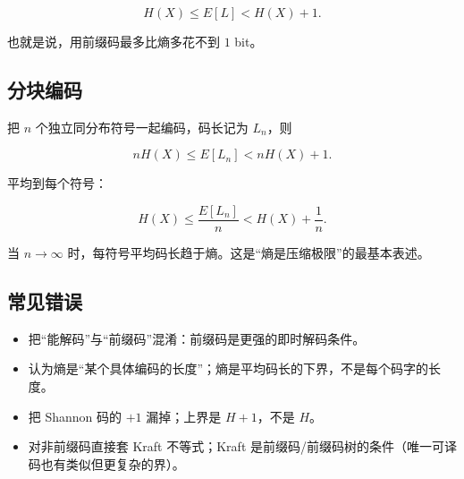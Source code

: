 \[
\boxed{
H(X)\le E[L]<H(X)+1
}.
\]

也就是说，用前缀码最多比熵多花不到 $1$ bit。

\subsection{分块编码}


把 $n$ 个独立同分布符号一起编码，码长记为 $L_n$，则

\[
nH(X)\le E[L_n]<nH(X)+1.
\]

平均到每个符号：

\[
H(X)\le\frac{E[L_n]}{n}<H(X)+\frac1n.
\]

当 $n\to\infty$ 时，每符号平均码长趋于熵。这是“熵是压缩极限”的最基本表述。

\subsection{常见错误}


\begin{itemize}
\item 把“能解码”与“前缀码”混淆：前缀码是更强的即时解码条件。
\item 认为熵是“某个具体编码的长度”；熵是平均码长的下界，不是每个码字的长度。
\item 把 Shannon 码的 $+1$ 漏掉；上界是 $H+1$，不是 $H$。
\item 对非前缀码直接套 Kraft 不等式；Kraft 是前缀码/前缀码树的条件（唯一可译码也有类似但更复杂的界）。
\end{itemize}

